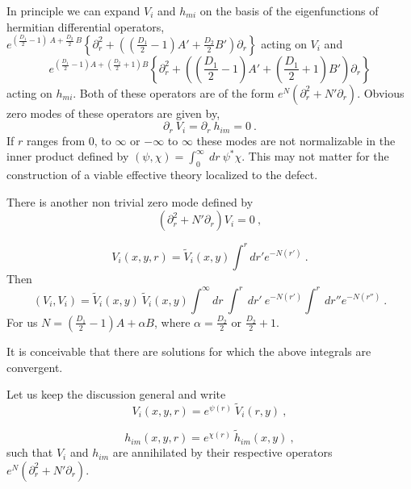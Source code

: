 \documentclass[a4paper,12pt]{article}
\begin{document}
\begin{appendix}
In principle we can expand $V_i$ and $h_{mi}$ on the basis of the
eigenfunctions of hermitian differential operators,
$e^{\left(\frac{D_1}{2}-1\right)\ A+\frac{D_2}{2}\
B}\left\{\partial^2_r
+\left(\left(\frac{D_1}{2}-1\right)A'+
\frac{D_2}{2} B'\right)\partial_r\right\}$ acting on $V_i$ and
\begin{equation}
e^{\left(\frac{D_1}{2}-1\right) A+\left(\frac{D_2}{2}+1\right)B}
\left\{ \partial^2_r+\left(\left(\frac{D_1}{2}-1\right)A'+
\left(\frac{D_1}{2}+1\right)B'\right) \partial_r\right\}
\end{equation}
acting on $h_{mi}$.  Both of these operators are of the form
$e^N(\partial^2_r + N'\partial_r)$. Obvious zero modes of these
operators are given by,
\begin{equation}
\partial_r\ V_i = \partial_r\ h_{im}=0~.
\end{equation}
If $r$ ranges from 0, to $\infty$ or $-\infty$  to $\infty$ these
modes are not normalizable in the inner product defined by
$(\psi,\chi) =\int^\infty_0\ dr\ \psi^*\chi$. This may not matter for
the construction of a viable effective theory localized to the
defect.

There is another non trivial  zero mode defined by
\begin{equation}
\left(\partial^2_r + N'\partial_r\right) V_i = 0~,
\end{equation}

\begin{equation}
V_i(x,y,r) = \tilde V_i(x,y)\int^rdr' e^{-N(r')}~.
\end{equation}
Then
\begin{equation}
(V_i,V_i) =\tilde V_i(x,y)\ \tilde V_i(x,y)
\int^\infty dr\ \int^r\ dr'\ e^{-N(r')}
\int^r\ dr'' e^{-N(r'')}~.
\end{equation}
For us $N= \left(\frac{D_1}{2}-1\right) A+\alpha B$, where $\alpha =
\frac{D_2}{2}$ or $\frac{D_2}{2} + 1$.

It is conceivable that there are solutions for which the above
integrals are convergent.

Let us keep the discussion general and write
\begin{equation}
V_i (x,y,r) = e^{\psi(r)}\ \tilde V_i(r,y)~,
\end{equation}

\begin{equation}
h_{im} (x,y,r) = e^{\chi(r)}\ \tilde h _{im} (x,y)~,
\end{equation}
such that  $V_i$ and $h_{im}$ are annihilated by their respective
operators $e^N(\partial^2_r + N'\partial_r)$.


\end{appendix}
\end{document}
